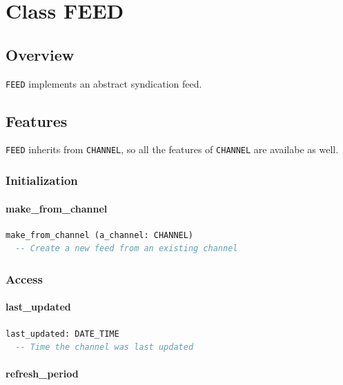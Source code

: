 \chapter{Class FEED}
\label{sec:feed-feed}


\section{Overview}
\label{sec:feed-overview}

\texttt{FEED} implements an abstract syndication feed.


\section{Features}
\label{sec:feed-features}

\texttt{FEED} inherits from \texttt{CHANNEL}, so all the
features of \texttt{CHANNEL} are availabe as well.

\subsection{Initialization}
\label{sec:feed-initialization}

\subsubsection{make\_from\_channel}

\begin{lstlisting}[language=Eiffel]
make_from_channel (a_channel: CHANNEL)
  -- Create a new feed from an existing channel
\end{lstlisting}

\subsection{Access}
\label{sec:feed-access}

\subsubsection{last\_updated}

\begin{lstlisting}[language=Eiffel]
last_updated: DATE_TIME
  -- Time the channel was last updated
\end{lstlisting}

\subsubsection{refresh\_period}

